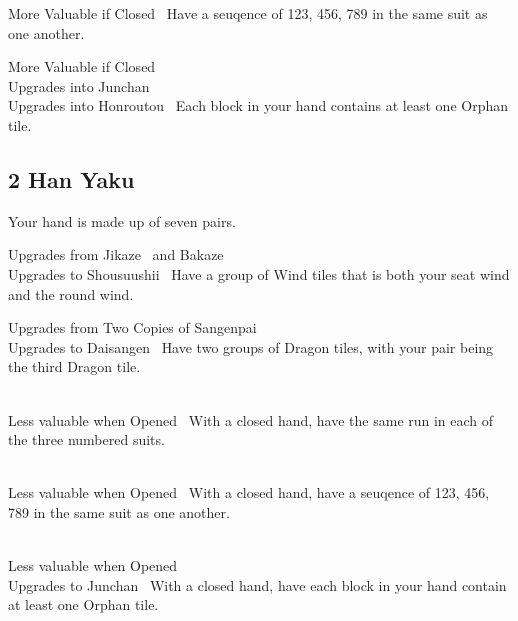 	{\morevaluable More Valuable if Closed~}
	{Have a seuqence of 123, 456, 789 in the same suit as one another.}

	{\morevaluable More Valuable if Closed~\\
	\upgradesto Upgrades into Junchan~\\
	\upgradesto Upgrades into Honroutou~}
	{Each block in your hand contains at least one Orphan tile.}


\subsection{2 Han Yaku}\label{core:ssec:2-han-yaku}

	{\closedhand}
	{Your hand is made up of seven pairs.}

	{\upgradesfrom Upgrades from Jikaze~ and Bakaze~\\
	\upgradesto Upgrades to Shousuushii~}
	{Have a group of Wind tiles that is both your seat wind and the round wind.}

	{\upgradesfrom Upgrades from Two Copies of Sangenpai~\\ 
	\upgradesto Upgrades to Daisangen~}
	{Have two groups of Dragon tiles, with your pair being the third Dragon tile.}

	{\closedhand \\ 
	\lessvaluable Less valuable when Opened~}
	{With a closed hand, have the same run in each of the three numbered suits.}

	{\closedhand \\
	\lessvaluable Less valuable when Opened~}
	{With a closed hand, have a seuqence of 123, 456, 789 in the same suit as one another.}

	{\closedhand \\ 
	\lessvaluable Less valuable when Opened~ \\
	\upgradesto Upgrades to Junchan~}
	{With a closed hand, have each block in your hand contain at least one Orphan tile.}

